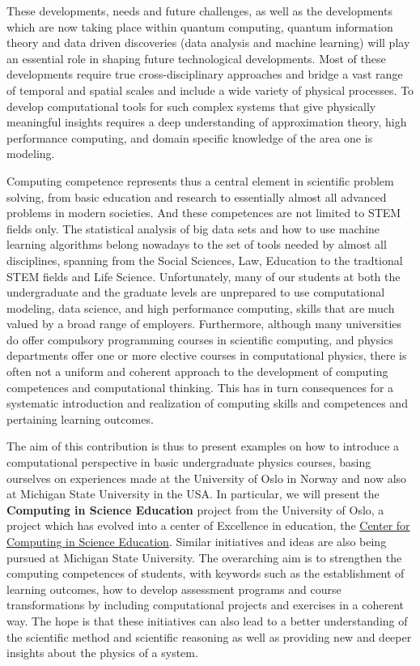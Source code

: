 \documentclass[graybox,envcountchap,sectrefs]{svmult}
\begin{document}
These developments, needs and future challenges, as well as the
developments which are now taking place within quantum computing,
quantum information theory and data driven discoveries (data analysis and
machine learning) will play an essential role in shaping future
technological developments. Most of these developments require true
cross-disciplinary approaches and bridge a vast range of
temporal and spatial scales and include a wide variety of physical
processes. To develop computational tools for such complex
systems that give physically meaningful insights requires a deep
understanding of approximation theory, high performance computing, and
domain specific knowledge of the area one is modeling.

Computing competence represents thus a central element in scientific
problem solving, from basic education and research to essentially
almost all advanced problems in modern societies. And these
competences are not limited to STEM fields only. The statistical
analysis of big data sets and how to use machine learning algorithms
belong nowadays to the set of tools needed by almost all disciplines,
spanning from the Social Sciences, Law, Education to the tradtional
STEM fields and Life Science.  Unfortunately, many of our students at
both the undergraduate and the graduate levels are unprepared to use
computational modeling, data science, and high performance computing,
skills that are much valued by a broad range of employers.
Furthermore, although many universities do offer compulsory
programming courses in scientific computing, and physics departments
offer one or more elective courses in computational physics, there is
often not a uniform and coherent approach to the development of
computing competences and computational thinking. This has in turn
consequences for a systematic introduction and realization of
computing skills and competences and pertaining learning outcomes.

The aim of this contribution is thus to present examples on how to
introduce a computational perspective in basic undergraduate physics
courses, basing ourselves on experiences made at the University of
Oslo in Norway and now also at Michigan State University in the
USA. In particular, we will present the \textbf{Computing in Science
Education} project from the University of Oslo, a project which has
evolved into a center of Excellence in education, the \href{{http://www.mn.uio.no/ccse/english/}}{Center for
Computing in Science
Education}. Similar initiatives
and ideas are also being pursued at Michigan State University.  The
overarching aim is to strengthen the computing competences of
students, with keywords such as the establishment of learning
outcomes, how to develop assessment programs and course
transformations by including computational projects and exercises in a
coherent way. The hope is that these initiatives can also lead to a
better understanding of the scientific method and scientific reasoning
as well as providing new and deeper insights about the physics of a
system.
\end{document}

